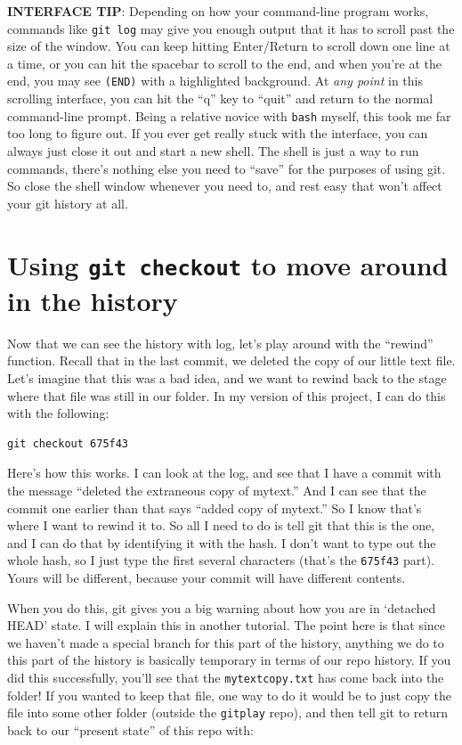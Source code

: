\documentclass[11pt]{article}
\begin{document}
\textbf{INTERFACE TIP}: Depending on how your command-line program works, commands like \texttt{git log} may give you enough output that it has to scroll past the size of the window. You can keep hitting Enter/Return to scroll down one line at a time, or you can hit the spacebar to scroll to the end, and when you're at the end, you may see \texttt{(END)} with a highlighted background. At \emph{any point} in this scrolling interface, you can hit the ``q'' key to ``quit'' and return to the normal command-line prompt.  Being a relative novice with \texttt{bash} myself, this took me far too long to figure out.  If you ever get really stuck with the interface, you can always just close it out and start a new shell. The shell is just a way to run commands, there's nothing else you need to ``save'' for the purposes of using git. So close the shell window whenever you need to, and rest easy that won't affect your git history at all.
\section{Using \texttt{git checkout} to move around in the history}
\label{sec-9}

Now that we can see the history with log, let's play around with the ``rewind'' function. Recall that in the last commit, we deleted the copy of our little text file. Let's imagine that this was a bad idea, and we want to rewind back to the stage where that file was still in our folder. In my version of this project, I can do this with the following:


\begin{verbatim}
git checkout 675f43
\end{verbatim}

Here's how this works. I can look at the log, and see that I have a commit with the message ``deleted the extraneous copy of mytext.''  And I can see that the commit one earlier than that says ``added copy of mytext.'' So I know that's where I want to rewind it to.  So all I need to do is tell git that this is the one, and I can do that by identifying it with the hash.  I don't want to type out the whole hash, so I just type the first several characters (that's the \texttt{675f43} part).  Yours will be different, because your commit will have different contents.

When you do this, git gives you a big warning about how you are in `detached HEAD' state. I will explain this in another tutorial. The point here is that since we haven't made a special branch for this part of the history, anything we do to this part of the history is basically temporary in terms of our repo history.  If you did this successfully, you'll see that the \texttt{mytextcopy.txt} has come back into the folder!  If you wanted to keep that file, one way to do it would be to just copy the file into some other folder (outside the \texttt{gitplay} repo), and then tell git to return back to our ``present state'' of this repo with:
\end{document}
